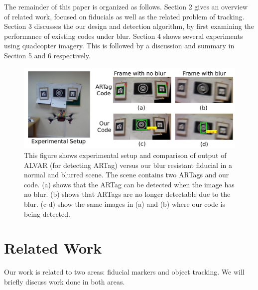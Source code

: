 \documentclass[runningheads]{llncs}
\begin{document}
The remainder of this paper is organized as follows.   Section 2 gives an
overview of related work, focused on fiducials as well as the related problem of
tracking.  Section 3 discusses the our design and detection algorithm, by first
examining the performance of existing codes under blur. Section 4 shows several
experiments using quadcopter imagery.  This is followed by a discussion and
summary in Section 5 and 6 respectively.

\begin{figure}
\includegraphics[width=\linewidth]{teaser.pdf}
\caption{This figure shows experimental setup and comparison of
output of ALVAR\cite{alvar} (for detecting ARTag) versus our blur resistant fiducial
in a normal and blurred scene. The scene contains two ARTags and our code.
(a) shows that the ARTag can be detected when the image has no blur. 
(b) shows that ARTags are no longer detectable due to the blur.
(c-d) show the same images in (a) and (b) where our code is being detected.}
\label{fig:teaser}
\end{figure}

\section{Related Work}

Our work is related to two areas: fiducial markers and object tracking. We will
briefly discuss work done in both areas.
\end{document}
